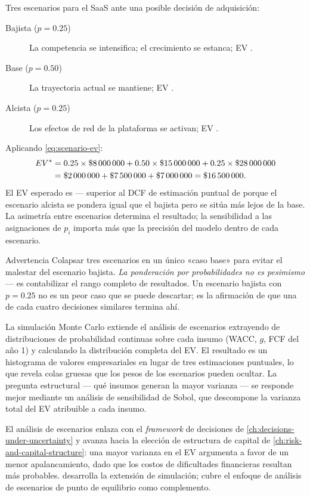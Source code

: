 \begin{example}
Tres escenarios para el SaaS ante una posible decisión de adquisición:

\begin{description}
  \item[Bajista (\(p=0.25\))] La competencia se intensifica; el crecimiento se estanca; EV .
  \item[Base (\(p=0.50\))] La trayectoria actual se mantiene; EV .
  \item[Alcista (\(p=0.25\))] Los efectos de red de la plataforma se activan; EV .
\end{description}

Aplicando \cref{eq:scenario-ev}:
\[
  \begin{aligned}
    EV^* &= 0.25\times\$\num{8000000}
          + 0.50\times\$\num{15000000}
          + 0.25\times\$\num{28000000} \\
         &= \$\num{2000000}+\$\num{7500000}+\$\num{7000000}
          = \$\num{16500000}.
  \end{aligned}
\]
El EV esperado es  --- superior al DCF de estimación puntual de
 porque el escenario alcista se pondera igual que el bajista pero se sitúa
más lejos de la base.
La asimetría entre escenarios determina el resultado; la sensibilidad a las asignaciones de \(p_i\)
importa más que la precisión del modelo dentro de cada escenario.
\end{example}

\begin{admonition}{Advertencia}
Colapsar tres escenarios en un único «caso base» para evitar el malestar del escenario bajista.
\emph{La ponderación por probabilidades no es pesimismo} --- es contabilizar el rango completo de
resultados. Un escenario bajista con \(p=0.25\) no es un peor caso que se puede descartar;
es la afirmación de que una de cada cuatro decisiones similares termina ahí.
\end{admonition}

La simulación Monte Carlo extiende el análisis de escenarios extrayendo de distribuciones de probabilidad
continuas sobre cada insumo (WACC, \(g\), FCF del año 1) y calculando la distribución completa del EV.
El resultado es un histograma de valores empresariales en lugar de tres estimaciones puntuales, lo que
revela colas gruesas que los pesos de los escenarios pueden ocultar. La pregunta estructural --- qué
insumos generan la mayor varianza --- se responde mejor mediante un análisis de sensibilidad de Sobol,
que descompone la varianza total del EV atribuible a cada insumo.

El análisis de escenarios enlaza con el \emph{framework} de decisiones de \cref{ch:decisions-under-uncertainty}
y avanza hacia la elección de estructura de capital de \cref{ch:risk-and-capital-structure}:
una mayor varianza en el EV argumenta a favor de un menor apalancamiento, dado que los costos de
dificultades financieras resultan más probables. \textcite{damodaran2012} desarrolla la extensión de
simulación; \textcite{brealey2020} cubre el enfoque de análisis de escenarios de punto de equilibrio
como complemento.
